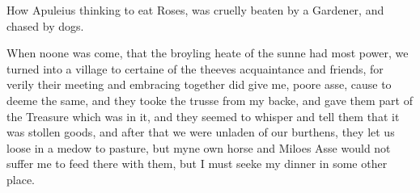 

How Apuleius thinking to eat Roses, was cruelly beaten by a Gardener, and
chased by dogs.

When noone was come, that the broyling heate of the sunne had most power, we
turned into a village to certaine of the theeves acquaintance and friends, for
verily their meeting and embracing together did give me, poore asse, cause to
deeme the same, and they tooke the trusse from my backe, and gave them part of
the Treasure which was in it, and they seemed to whisper and tell them that it
was stollen goods, and after that we were unladen of our burthens, they let us
loose in a medow to pasture, but myne own horse and Miloes Asse would not
suffer me to feed there with them, but I must seeke my dinner in some other
place.

